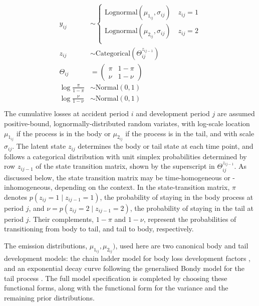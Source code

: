 \begin{align}
	\begin{split}
	\label{eq:hmm}
	y_{ij} &\sim \begin{cases}
        \mathrm{Lognormal}(\mu_{1_{ij}}, \sigma_{ij}) \quad z_{ij} = 1\\
        \mathrm{Lognormal}(\mu_{2_{ij}}, \sigma_{ij}) \quad z_{ij} = 2\\
	\end{cases}\\
    z_{ij} &\sim \mathrm{Categorical}(\Theta^{z_{ij-1}}_{ij})\\
    \Theta_{ij} &= \begin{pmatrix}
        \pi & 1 - \pi\\
        \nu & 1 - \nu
    \end{pmatrix}\\
    \log \frac{\pi}{1 - \pi} &\sim \mathrm{Normal}(0, 1)\\
    \log \frac{\nu}{1 - \nu} &\sim \mathrm{Normal}(0, 1)\\
	\end{split}
\end{align}
%
The cumulative losses at accident period $i$ and development period $j$
are assumed positive-bound, lognormally-distributed random variates,
with log-scale location $\mu_{1_{ij}}$ if the process is in the body
or $\mu_{2_{ij}}$ if the process is in the tail, and with scale $\sigma_{ij}$.
The latent state $z_{ij}$ determines the body or tail state at each
time point, and follows a categorical distribution with unit simplex probabilities
determined by row $z_{ij - 1}$ of the state transition matrix, shown
by the superscript in $\Theta_{ij}^{z_{ij - 1}}$. 
As discussed below, the state transition matrix
may be time-homogeneous or -inhomogeneous, depending on the context.
In the state-transition matrix, 
$\pi$ denotes $p(z_{ij} = 1 \mid z_{ij-1} = 1)$, the 
probability of staying in the body
process at period $j$, and $\nu = p(z_{ij} = 2 \mid z_{ij-1} = 2)$,
the probability of staying in the tail at period $j$.
Their complements, $1 - \pi$ and $1 - \nu$, represent the
probabilities of transitioning from body to tail, and tail
to body, respectively.

The emission distributions, $\mu_{1_{ij}}, \mu_{2_{ij}})$,
used here are two canonical body and tail development models:
the chain ladder model for body loss development factors
\citep{mack1993,englandverrall2002},
and an exponential decay curve following the generalised Bondy model
for the tail process \citep{tailfactors2013}.
The full model specification is completed by choosing these
functional forms, along with the functional form for the variance
and the remaining prior distributions.


